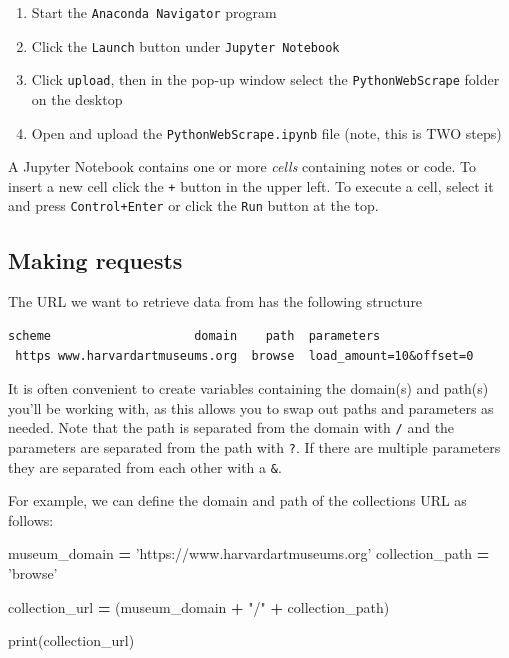 \documentclass[]{book}
\newenvironment{Shaded}{\begin{snugshade}}{\end{snugshade}}
\newcommand{\BuiltInTok}[1]{#1}
\newcommand{\NormalTok}[1]{#1}
\newcommand{\OperatorTok}[1]{\textcolor[rgb]{0.81,0.36,0.00}{\textbf{#1}}}
\newcommand{\StringTok}[1]{\textcolor[rgb]{0.31,0.60,0.02}{#1}}
\providecommand{\tightlist}{%
  \setlength{\itemsep}{0pt}\setlength{\parskip}{0pt}}
\begin{document}
\begin{enumerate}
\def\labelenumi{\arabic{enumi}.}
\tightlist
\item
  Start the \texttt{Anaconda\ Navigator} program
\item
  Click the \texttt{Launch} button under \texttt{Jupyter\ Notebook}
\item
  Click \texttt{upload}, then in the pop-up window select the \texttt{PythonWebScrape} folder on the desktop
\item
  Open and upload the \texttt{PythonWebScrape.ipynb} file (note, this is TWO steps)
\end{enumerate}

A Jupyter Notebook contains one or more \emph{cells} containing notes or code. To insert a new cell click the \texttt{+} button in the upper left. To execute a cell, select it and press \texttt{Control+Enter} or click the \texttt{Run} button at the top.

\hypertarget{making-requests}{%
\subsection{Making requests}\label{making-requests}}

The URL we want to retrieve data from has the following structure

\begin{verbatim}
scheme                    domain    path  parameters
 https www.harvardartmuseums.org  browse  load_amount=10&offset=0
\end{verbatim}

It is often convenient to create variables containing the domain(s)
and path(s) you'll be working with, as this allows you to swap out
paths and parameters as needed. Note that the path is separated from
the domain with \texttt{/} and the parameters are separated from the path
with \texttt{?}. If there are multiple parameters they are separated from
each other with a \texttt{\&}.

For example, we can define the domain and path of the collections URL
as follows:

\begin{Shaded}
\begin{Highlighting}[]
\NormalTok{museum_domain }\OperatorTok{=} \StringTok{'https://www.harvardartmuseums.org'}
\NormalTok{collection_path }\OperatorTok{=} \StringTok{'browse'}

\NormalTok{collection_url }\OperatorTok{=}\NormalTok{ (museum_domain}
                  \OperatorTok{+} \StringTok{"/"}
                  \OperatorTok{+}\NormalTok{ collection_path)}

\BuiltInTok{print}\NormalTok{(collection_url)}
\end{Highlighting}
\end{Shaded}
\end{document}
